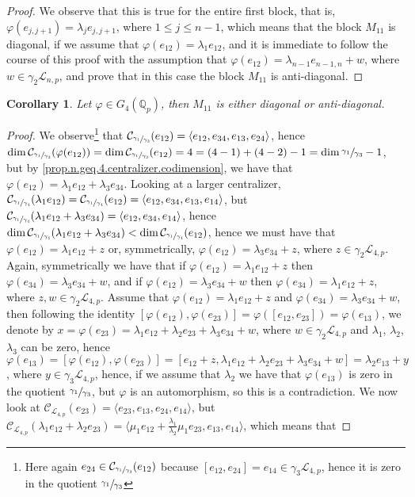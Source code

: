 \documentclass[12pt]{article}
\newtheorem{corollary}[theorem]{Corollary}
\begin{document}
\begin{proof}
We observe that this is true for the entire first block, that is, $\varphi(e_{j,j+1})=\lambda_j e_{j,j+1}$, where $1\leq j\leq n-1$, which means that the block $M_{11}$ is diagonal, if we assume that $\varphi(e_{12})=\lambda_1 e_{12}$, and it is immediate to follow the course of this proof with the assumption that $\varphi(e_{12})=\lambda_{n-1}e_{n-1,n}+w$, where $w\in\gamma_2\mathcal{L}_{n,p}$, and prove that in this case the block $M_{11}$ is anti-diagonal.
\end{proof}
\begin{corollary}
\label{m11.n.4}
Let $\varphi\in G_4(\mathbb{Q}_p)$, then $M_{11}$ is either diagonal or anti-diagonal.
\end{corollary}
\begin{proof}
We observe\footnote{Here again $e_{24}\in\mathcal{C}_{\sfrac{\gamma_1}{\gamma_3}}(e_{12})$ because $[e_{12},e_{24}]=e_{14}\in\gamma_3\mathcal{L}_{4,p}$, hence it is zero in the quotient $\sfrac{\gamma_1}{\gamma_3}$} that $\mathcal{C}_{\sfrac{\gamma_1}{\gamma_3}}(e_{12})=\langle e_{12},e_{34},e_{13},e_{24}\rangle$, hence $\dim\mathcal{C}_{\sfrac{\gamma_1}{\gamma_3}}(\varphi(e_{12}))=\dim\mathcal{C}_{\sfrac{\gamma_1}{\gamma_3}}(e_{12})=4=(4-1)+(4-2)-1=\dim\sfrac{\gamma_1}{\gamma_3}-1$, but by \ref{prop.n.geq.4.centralizer.codimension}, we have that $\varphi(e_{12})=\lambda_1 e_{12}+\lambda_3 e_{34}$. Looking at a larger centralizer, $\mathcal{C}_{\sfrac{\gamma_1}{\gamma_4}}(\lambda_1 e_{12})=\mathcal{C}_{\sfrac{\gamma_1}{\gamma_4}}(e_{12})=\langle e_{12},e_{34},e_{13},e_{14}\rangle$, but $\mathcal{C}_{\sfrac{\gamma_1}{\gamma_4}}(\lambda_1 e_{12}+\lambda_3 e_{34})=\langle e_{12},e_{34},e_{14}\rangle$, hence $\dim\mathcal{C}_{\sfrac{\gamma_1}{\gamma_4}}(\lambda_1 e_{12}+\lambda_3 e_{34})<\dim\mathcal{C}_{\sfrac{\gamma_1}{\gamma_4}}(e_{12})$, hence we must have that $\varphi(e_{12})=\lambda_1 e_{12}+z$ or, symmetrically, $\varphi(e_{12})=\lambda_3 e_{34}+z$, where $z\in\gamma_2\mathcal{L}_{4,p}$. Again, symmetrically we have that if $\varphi(e_{12})=\lambda_1 e_{12}+z$ then $\varphi(e_{34})=\lambda_3 e_{34}+w$, and if $\varphi(e_{12})=\lambda_3 e_{34}+w$ then $\varphi(e_{34})=\lambda_1 e_{12}+z$, where $z,w\in\gamma_2\mathcal{L}_{4,p}$. Assume that $\varphi(e_{12})=\lambda_1 e_{12}+z$ and $\varphi(e_{34})=\lambda_3 e_{34}+w$, then following the identity $[\varphi(e_{12}),\varphi(e_{23})]=\varphi([e_{12},e_{23}])=\varphi(e_{13})$, we denote by $x=\varphi(e_{23})=\lambda_1 e_{12}+\lambda_2 e_{23}+\lambda_3 e_{34}+w$, where $w\in\gamma_2\mathcal{L}_{4,p}$ and $\lambda_1$, $\lambda_2$, $\lambda_3$ can be zero, hence $\varphi(e_{13})=[\varphi(e_{12}),\varphi(e_{23})]=[e_{12}+z,\lambda_1 e_{12}+\lambda_2 e_{23}+\lambda_3 e_{34}+w]=\lambda_2 e_{13}+y$, where $y\in\gamma_3\mathcal{L}_{4,p}$, hence, if we assume that $\lambda_2$ we have that $\varphi(e_{13})$ is zero in the quotient $\sfrac{\gamma_1}{\gamma_3}$, but $\varphi$ is an automorphism, so this is a contradiction. We now look at $\mathcal{C}_{\mathcal{L}_{4,p}}(e_{23})=\langle e_{23},e_{13},e_{24},e_{14}\rangle$, but $\mathcal{C}_{\mathcal{L}_{4,p}}(\lambda_1 e_{12}+\lambda_2 e_{23})=\langle \mu_1 e_{12}+\frac{\lambda_1}{\lambda_2}\mu_1 e_{23},e_{13},e_{14}\rangle$, which means that 
\end{proof}
\end{document}
